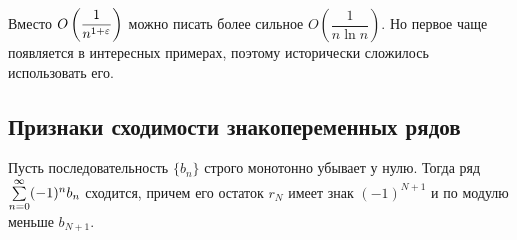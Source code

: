 \documentclass[a4paper, 12pt]{article}
\begin{document}
\begin{Comment}
Вместо $O\left(\dfrac{1}{n^{1+\varepsilon}} \right)$ можно писать более сильное $O\left(
\dfrac{1}{n\ln n} \right)$. Но первое чаще появляется в интересных примерах, поэтому исторически сложилось использовать его.
\end{Comment}

\subsection{Признаки сходимости знакопеременных рядов}
\begin{Test}
Пусть последовательность $\{b_n\}$ строго монотонно убывает у нулю. Тогда ряд $\sum\limits_{n=0}^{\infty}(-1)^nb_n$ сходится, причем его остаток $r_N$ имеет знак $(-1)^{N+1}$ и по модулю меньше $b_{N+1}$.
\end{Test}
\end{document}
